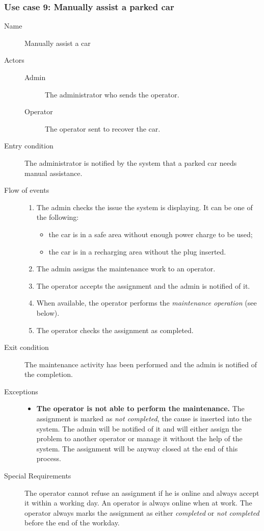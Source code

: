 	\subsubsection{Use case 9: Manually assist a parked car}
		\begin{description}
			\item[Name] Manually assist a car
			\item[Actors] \hfill
				\begin{description}
					\item[Admin] The administrator who sends the operator.
					\item[Operator] The operator sent to recover the car.
				\end{description}
			\item[Entry condition] The administrator is notified by the system that a parked car needs manual assistance.
			\item[Flow of events] \hfill
				\begin{enumerate}
					\item The admin checks the issue the system is displaying. It can be one of the following:
						\begin{itemize}
							\item the car is in a safe area without enough power charge to be used;
							\item the car is in a recharging area without the plug inserted.
						\end{itemize}
					\item The admin assigns the maintenance work to an operator.
					\item The operator accepts the assignment and the admin is notified of it.
					\item When available, the operator performs the \textit{maintenance operation} (see below).
					\item The operator checks the assignment as completed.
				\end{enumerate}
			\item[Exit condition] The maintenance activity has been performed and the admin is notified of the completion.
			\item[Exceptions] \hfill
				\begin{itemize}
					\item \textbf{The operator is not able to perform the maintenance.} The assignment is marked as \textit{not completed}, the cause is inserted into the system. The admin will be notified of it and will either assign the problem to another operator or manage it without the help of the system. The assignment will be anyway closed at the end of this process.
				\end{itemize}
			\item[Special Requirements] The operator cannot refuse an assignment if he is online and always accept it within a working day. An operator is always online when at work.
			The operator always marks the assignment as either \textit{completed} or \textit{not completed} before the end of the workday.
		\end{description}
